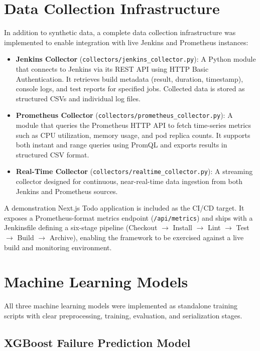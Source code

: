 \documentclass[12pt]{report}
\begin{document}
\section{Data Collection Infrastructure}

In addition to synthetic data, a complete data collection infrastructure was implemented to enable integration with live Jenkins and Prometheus instances:

\begin{itemize}
    \item \textbf{Jenkins Collector} (\texttt{collectors/jenkins\_collector.py}): A Python module that connects to Jenkins via its REST API using HTTP Basic Authentication. It retrieves build metadata (result, duration, timestamp), console logs, and test reports for specified jobs. Collected data is stored as structured CSVs and individual log files.

    \item \textbf{Prometheus Collector} (\texttt{collectors/prometheus\_collector.py}): A module that queries the Prometheus HTTP API to fetch time-series metrics such as CPU utilization, memory usage, and pod replica counts. It supports both instant and range queries using PromQL and exports results in structured CSV format.

    \item \textbf{Real-Time Collector} (\texttt{collectors/realtime\_collector.py}): A streaming collector designed for continuous, near-real-time data ingestion from both Jenkins and Prometheus sources.
\end{itemize}

A demonstration Next.js Todo application is included as the CI/CD target. It exposes a Prometheus-format metrics endpoint (\texttt{/api/metrics}) and ships with a Jenkinsfile defining a six-stage pipeline (Checkout $\rightarrow$ Install $\rightarrow$ Lint $\rightarrow$ Test $\rightarrow$ Build $\rightarrow$ Archive), enabling the framework to be exercised against a live build and monitoring environment.

\section{Machine Learning Models}

All three machine learning models were implemented as standalone training scripts with clear preprocessing, training, evaluation, and serialization stages.

\subsection{XGBoost Failure Prediction Model}
\end{document}
